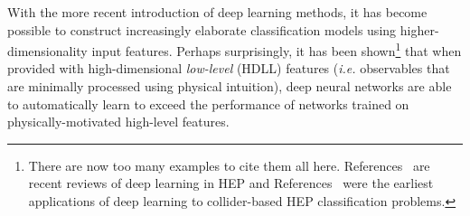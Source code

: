 \documentclass[reprint,nofootinbib,...]{revtex4-1}
\begin{document}



With the more recent introduction of deep learning methods, it has become possible to construct increasingly elaborate classification models using higher-dimensionality input features.
Perhaps surprisingly, it has been shown\footnote{There are now too many examples to cite them all here.  References~\cite{Larkoski:2017jix,Radovic:2018dip,Guest:2018yhq} are recent reviews of deep learning in HEP and References~\cite{Baldi:2014kfa,deOliveira:2015xxd,Baldi:2016fql,Guest:2016iqz} were the earliest applications of deep learning to collider-based HEP classification problems.} that when provided with high-dimensional \textit{low-level} (HDLL) features (\textit{i.e.} observables that are minimally processed using physical intuition), deep neural networks are able to automatically learn to exceed the performance of networks trained on physically-motivated high-level features.
\end{document}
